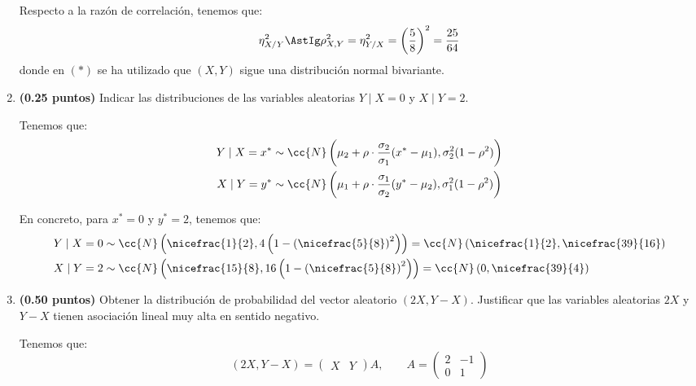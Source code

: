 \documentclass[12pt]{article}
\begin{document}
\begin{ejercicio}[1 puntos]
\begin{enumerate}
            Respecto a la razón de correlación, tenemos que:
            \begin{equation*}
                \eta_{X/Y}^2\AstIg \rho_{X,Y}^2 = \eta_{Y/X}^2=\left(\dfrac{5}{8}\right)^2 = \dfrac{25}{64}
            \end{equation*}
            donde en $(\ast)$ se ha utilizado que $(X,Y)$ sigue una distribución normal bivariante.

            \item \textbf{(0.25 puntos)} Indicar las distribuciones de las variables aleatorias $Y\mid X=0$ y $X\mid Y=2$.
            
            Tenemos que:
            \begin{align*}
                Y\mid X=x^* &\sim \cc{N}\left(\mu_2+\rho\cdot \dfrac{\sigma_2}{\sigma_1}(x^*-\mu_1),\sigma_2^2(1-\rho^2)\right) \\
                X\mid Y=y^* &\sim \cc{N}\left(\mu_1+\rho\cdot \dfrac{\sigma_1}{\sigma_2}(y^*-\mu_2),\sigma_1^2(1-\rho^2)\right)
            \end{align*}

            En concreto, para $x^*=0$ y $y^*=2$, tenemos que:
            \begin{align*}
                Y\mid X=0 &\sim \cc{N}\left(\nicefrac{1}{2},4\left(1-\left(\nicefrac{5}{8}\right)^2\right)\right) = \cc{N}\left(\nicefrac{1}{2},\nicefrac{39}{16}\right) \\
                X\mid Y=2 &\sim \cc{N}\left(\nicefrac{15}{8},16\left(1-\left(\nicefrac{5}{8}\right)^2\right)\right) = \cc{N}\left(0,\nicefrac{39}{4}\right)
            \end{align*}
            \item \textbf{(0.50 puntos)} Obtener la distribución de probabilidad del vector aleatorio $(2X, Y-X)$. Justificar que las variables aleatorias $2X$ y $Y-X$ tienen asociación lineal muy alta en sentido negativo.
            
            Tenemos que:
            \begin{equation*}
                (2X,Y-X) = \begin{pmatrix}
                    X & Y
                \end{pmatrix}A,\qquad A = 
                \begin{pmatrix}
                    2 & -1 \\ 0 & 1
                \end{pmatrix}
            \end{equation*}


\end{enumerate}
\end{ejercicio}
\end{document}
